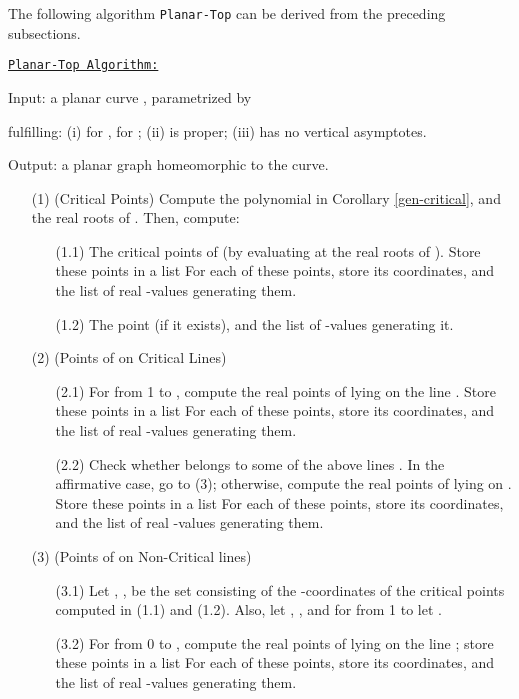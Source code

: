 \documentclass{elsart}
\begin{document}
The following algorithm {\tt Planar-Top} can be derived from the preceding subsections.

\underline{\tt Planar-Top Algorithm:}

{\sf Input:}  a planar curve , parametrized by

fulfilling: (i)  for ,
 for ; (ii)  is proper; (iii)
 has no vertical asymptotes.

{\sf Output:} a planar graph  homeomorphic to the
curve.

\begin{itemize}
\item [(1)] (Critical Points) Compute the polynomial  in Corollary \ref{gen-critical}, and the real roots of . Then, compute:
 \begin{itemize}
 \item [(1.1)] The critical points of  (by evaluating  at the real roots of ). Store these points in a list For each of these points, store its coordinates, and the list of real -values generating them.
 \item [(1.2)] The point  (if it exists), and the list of -values generating it.
 \end{itemize}
\item [(2)] (Points of  on Critical Lines)
\begin{itemize}
\item [(2.1)] For  from 1 to , compute the real points of  lying on the line . Store these points in a list
    For each of these points, store its coordinates, and the list of real -values generating them.
\item [(2.2)] Check whether  belongs to some of the above lines . In the affirmative case, go to (3); otherwise,
compute the real points of  lying on . Store these points in a list
For each of these points, store its coordinates, and the list of real -values generating them.
    \end{itemize}
    \item [(3)] (Points of  on Non-Critical lines)
    \begin{itemize}
    \item [(3.1)] Let , , be the set consisting
    of the -coordinates of the critical points computed in (1.1) and (1.2). Also, let , ,
    and for  from 1 to
     let .
        \item [(3.2)] For  from 0 to , compute the real points of  lying on the line ; store these points in a list
            For each of these points, store its coordinates, and the list of real -values generating them.

\end{itemize}
\end{itemize}
\end{document}
